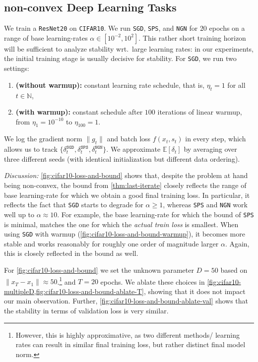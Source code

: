 \documentclass{article}
\newcommand{\N}{\mathbb{N}}
\newcommand{\E}{\mathbb{E}}
\newcommand{\SGD}{{\texttt{SGD}}}
\newcommand{\SPS}{{\texttt{SPS}}}
\newcommand{\NGN}{{\texttt{NGN}}}
\theoremstyle{plain}
\theoremstyle{definition}
\theoremstyle{remark}
\begin{document}
%
\subsection{non-convex Deep Learning Tasks}
We train a \texttt{ResNet20} on \texttt{CIFAR10}. 
We run \SGD{}, \SPS{}, and \NGN{} for $20$ epochs on a range of base learning-rates $\alpha\in [10^{-2}, 10^2]$. This rather short training horizon will be sufficient to analyze stability wrt.\ large learning rates: in our experiments, the initial training stage is usually decisive for stability.
%
For \SGD{}, we run two settings:
\begin{enumerate}[label=(\arabic*)]
    \item \textbf{(without warmup):} constant learning rate schedule, that is, $\eta_t=1$ for all $t\in \N$,
    \item \textbf{(with warmup):} constant schedule after $100$ iterations of linear warmup, from $\eta_1 = 10^{-10}$ to $\eta_{100} = 1$.
\end{enumerate}

We log the gradient norm $\|g_t\|$ and batch loss $f(x_t,s_t)$ in every step, which allows us to track $\{\delta_t^{\SGD{}}, \delta_t^{\SPS{}}, \delta_t^{\NGN{}}\}$. We approximate $\E[\delta_t]$ by averaging over three different seeds (with identical initialization but different data ordering).
%

\textit{Discussion:} \cref{fig:cifar10-loss-and-bound} shows that, despite the problem at hand being non-convex, the bound from \cref{thm:last-iterate} closely reflects the range of base learning-rate for which we obtain a good final training loss. In particular, it reflects the fact that \SGD{} starts to degrade for $\alpha \geq 1$, whereas \SPS{} and \NGN{} work well up to $\alpha \approx 10$. For example, the base learning-rate for which the bound of \SPS{} is minimal, matches the one for which the \emph{actual train loss} is smallest. When using \SGD{} with warmup (\cref{fig:cifar10-loss-and-bound-warmup}), it becomes more stable and works reasonably for roughly one order of magnitude larger $\alpha$. Again, this is closely reflected in the bound as well.

For \cref{fig:cifar10-loss-and-bound} we set the unknown parameter $D = 50$ based on $\|x_T - x_1\| \approx 50$.\footnote{However, this is highly approximative, as two different methods/ learning rates can result in similar final training loss, but rather distinct final model norm.
}
and $T=20$ epochs. We ablate these choices in \cref{fig:cifar10-multipleD,fig:cifar10-loss-and-bound-ablate-T}, showing that it does not impact our main observation. Further, \cref{fig:cifar10-loss-and-bound-ablate-val} shows that the stability in terms of validation loss is very similar.
\end{document}

